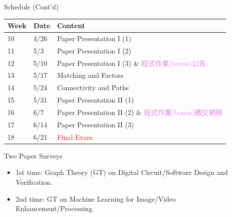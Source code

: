 \documentclass[aspectratio=169, 14pt, UTF8, t]{beamer}
\let\olditem\item
\renewcommand\item{\olditem\justifying}
\begin{document}
\begin{frame}{Schedule (Cont'd)}
  \centering
  \begin{tabular}{llm{7cm}}
    \hline
    Week & Date & Content                                                                   \\ \hline
    10   & 4/26 & Paper Presentation I (1)                                                  \\
    11   & 5/3  & Paper Presentation I (2)                                                  \\
    12   & 5/10 & Paper Presentation I (3) \& \newline \textcolor{violet}{程式作業(bonus)公告}    \\
    13   & 5/17 & Matching and Factors                                                      \\
    14   & 5/24 & Connectivity and Paths                                                    \\
    15   & 5/31 & Paper Presentation II (1)                                                 \\
    16   & 6/7  & Paper Presentation II (2) \& \newline \textcolor{violet}{程式作業(bonus)繳交期限} \\
    17   & 6/14 & Paper Presentation II (3)                                                 \\
    18   & 6/21 & \textcolor{red}{Final Exam}                                               \\ \hline
  \end{tabular}
\end{frame}

\begin{frame}{Two Paper Surveys}
  \begin{itemize}
    \item 1st time: Graph Theory (GT) on Digital Circuit/Software Design and Verification.
    \item 2nd time: GT on Machine Learning for Image/Video Enhancement/Processing.
  \end{itemize}
\end{frame}
\end{document}
